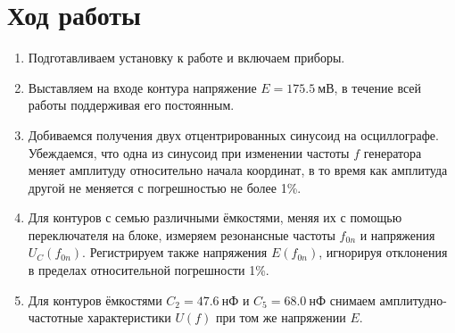 \documentclass[a4paper,14pt]{article}
\begin{document}
\section*{Ход работы}

\begin{enumerate}


\item Подготавливаем установку к работе и включаем приборы.

\item Выставляем на входе контура напряжение $E = 175.5~\text{мВ}$, в течение всей работы поддерживая его постоянным.

\item Добиваемся получения двух отцентрированных синусоид на осциллографе. Убеждаемся, что одна из синусоид при изменении частоты $f$ генератора меняет амплитуду относительно начала координат, в то время как амплитуда другой не меняется с погрешностью не более 1\%.

\item Для контуров с семью различными ёмкостями, меняя их с помощью переключателя на
блоке, измеряем резонансные частоты $f_{0n}$ и напряжения $U_C(f_{0n})$. Регистрируем также
напряжения $E(f_{0n})$, игнорируя отклонения в пределах относительной погрешности 1\%.

\item Для контуров ёмкостями $C_2 = 47.6~\text{нФ}$ и $C_5 = 68.0~\text{нФ}$ снимаем амплитудно-частотные характеристики $U(f)$ при том же напряжении $E$.


\end{enumerate}
\end{document}
